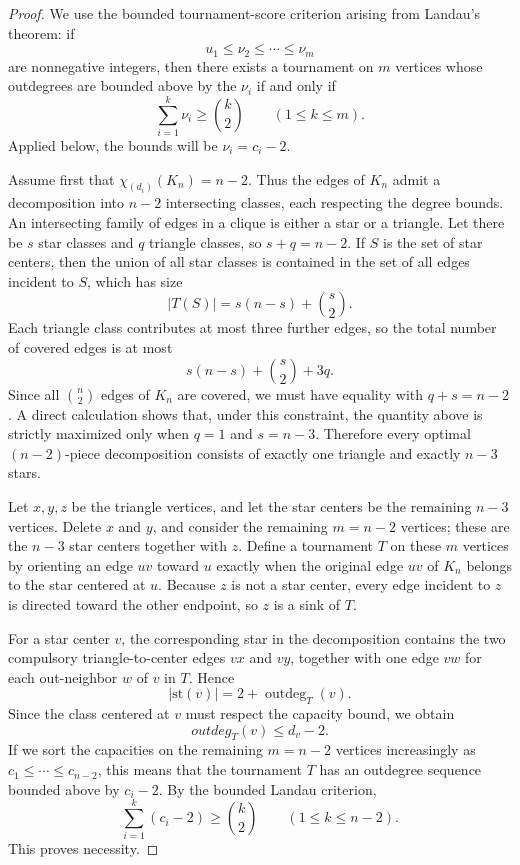 \documentclass[11pt]{article}
\theoremstyle{definition}
\newcommand{\Chi}{\chi}
\newcommand{\st}{\mathrm{st}}
\newcommand{\outdeg}{\operatorname{outdeg}}
\begin{document}
\begin{proof}
We use the bounded tournament-score criterion arising from Landau's theorem: if
\[
u_1\le \nu_2\le \cdots \le \nu_m
\]
are nonnegative integers, then there exists a tournament on \(m\) vertices whose outdegrees are bounded above by the \(\nu_i\) if and only if
\[
\sum_{i=1}^k \nu_i\ge \binom{k}{2}
\qquad(1\le k\le m).
\]
Applied below, the bounds will be \(\nu_i=c_i-2\).

Assume first that \(\Chi_{(d_i)}(K_n)=n-2\). Thus the edges of \(K_n\) admit a decomposition into \(n-2\) intersecting classes, each respecting the degree bounds. An intersecting family of edges in a clique is either a star or a triangle. Let there be \(s\) star classes and \(q\) triangle classes, so \(s+q=n-2\). If \(S\) is the set of star centers, then the union of all star classes is contained in the set of all edges incident to \(S\), which has size
\[
|T(S)|=s(n-s)+\binom{s}{2}.
\]
Each triangle class contributes at most three further edges, so the total number of covered edges is at most
\[
s(n-s)+\binom{s}{2}+3q.
\]
Since all \(\binom n2\) edges of \(K_n\) are covered, we must have equality with \(q+s=n-2\). A direct calculation shows that, under this constraint, the quantity above is strictly maximized only when \(q=1\) and \(s=n-3\). Therefore every optimal \((n-2)\)-piece decomposition consists of exactly one triangle and exactly \(n-3\) stars.

Let \(x,y,z\) be the triangle vertices, and let the star centers be the remaining \(n-3\) vertices. Delete \(x\) and \(y\), and consider the remaining \(m=n-2\) vertices; these are the \(n-3\) star centers together with \(z\). Define a tournament \(T\) on these \(m\) vertices by orienting an edge \(uv\) toward \(u\) exactly when the original edge \(uv\) of \(K_n\) belongs to the star centered at \(u\). Because \(z\) is not a star center, every edge incident to \(z\) is directed toward the other endpoint, so \(z\) is a sink of \(T\).

For a star center \(v\), the corresponding star in the decomposition contains the two compulsory triangle-to-center edges \(vx\) and \(vy\), together with one edge \(vw\) for each out-neighbor \(w\) of \(v\) in \(T\). Hence
\[
|\st(v)|=2+\outdeg_T(v).
\]
Since the class centered at \(v\) must respect the capacity bound, we obtain
\[
outdeg_T(v)\le d_v-2.
\]
If we sort the capacities on the remaining \(m=n-2\) vertices increasingly as \(c_1\le \cdots\le c_{n-2}\), this means that the tournament \(T\) has an outdegree sequence bounded above by \(c_i-2\). By the bounded Landau criterion,
\[
\sum_{i=1}^k (c_i-2)\ge \binom{k}{2}
\qquad(1\le k\le n-2).
\]
This proves necessity.


\end{proof}
\end{document}
